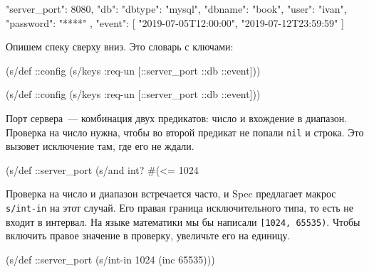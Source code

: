 
\begin{english}
  \begin{json}
{
    "server_port": 8080,
    "db": {
        "dbtype":   "mysql",
        "dbname":   "book",
        "user":     "ivan",
        "password": "****"
    },
    "event": [
        "2019-07-05T12:00:00",
        "2019-07-12T23:59:59"
    ]
}
  \end{json}
\end{english}

\noindent
Опишем спеку сверху вниз. Это словарь с ключами:

\ifnarrow

\begin{english}
  \begin{clojure}
(s/def ::config
  (s/keys :req-un [::server_port
                   ::db ::event]))
  \end{clojure}
\end{english}

\else

\begin{english}
  \begin{clojure}
(s/def ::config
  (s/keys :req-un [::server_port ::db ::event]))
  \end{clojure}
\end{english}

\fi


Порт сервера~--- комбинация двух предикатов: число и вхождение в диапазон.
Проверка на число нужна, чтобы во второй предикат не попали \verb|nil| и
строка. Это вызовет исключение там, где его не ждали.

\begin{english}
  \begin{clojure}
(s/def ::server_port
  (s/and int? #(<= 1024 %
  \end{clojure}
\end{english}


Проверка на число и диапазон встречается часто, и Spec предлагает макрос
\verb|s/int-in| на этот случай. Его правая граница исключительного типа, то есть
не входит в интервал. На языке математики мы бы написали \verb|[1024, 65535)|.
Чтобы включить правое значение в проверку, увеличьте его на единицу.

\begin{english}
  \begin{clojure}
(s/def ::server_port
  (s/int-in 1024 (inc 65535)))
  \end{clojure}
\end{english}

